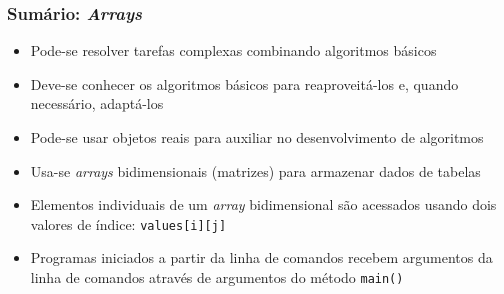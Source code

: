 \documentclass[xcolor={dvipsnames,table},aspectratio=169]{beamer}
\begin{document}
\begin{frame}\frametitle{Sumário: \emph{Arrays}}
\begin{itemize}
	\item Pode-se resolver tarefas complexas combinando algoritmos básicos
	\item Deve-se conhecer os algoritmos básicos para reaproveitá-los e, quando necessário, adaptá-los 
	\item Pode-se usar objetos reais para auxiliar no desenvolvimento de algoritmos
	\item Usa-se \emph{arrays} bidimensionais (matrizes) para armazenar dados de tabelas
	\item Elementos individuais de um \emph{array} bidimensional são acessados usando dois valores de índice: \texttt{values[i][j]}
	\item Programas iniciados a partir da linha de comandos recebem argumentos da linha de comandos através de argumentos do método \texttt{main()}
\end{itemize}
\end{frame}

\end{document}
